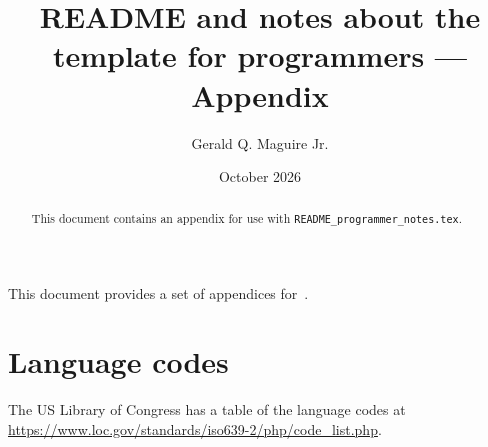 \documentclass[12pt, twoside]{article}
\title{README and notes about the template for programmers --- Appendix}
\author{Gerald Q. Maguire Jr.}
\date{October 2026}
\renewcommand{\sectionmark}[1]{%
\markboth{#1}{}}
\newcommand{\fname}[1]{\texttt{#1}}
\begin{document}
\glsresetall
\maketitle
{}

\begin{abstract}
This document contains an appendix for use with \fname{README\_programmer\_notes.tex}.


\end{abstract}
\cleardoublepage


\renewcommand{\sectionmark}[1]{ \markboth{#1}{}}
\tableofcontents
\markboth{\contentsname}{}
\cleardoublepage
 
\setcounter{page}{1}
\glsresetall

This document provides a set of appendices for~\cite{maguire2026programmersguide_testing}.

\appendix
\section{Language codes}
\label{sec:LanguageCodes}
The US Library of Congress has a table of the language codes at \url{https://www.loc.gov/standards/iso639-2/php/code_list.php}.
\end{document}
